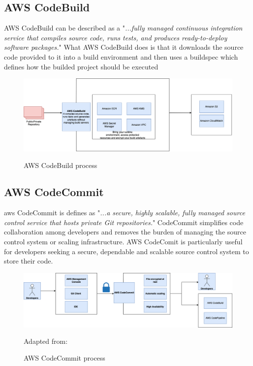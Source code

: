 \subsection{AWS CodeBuild }
AWS CodeBuild can be described as a "\textit{...fully managed continuous integration service that compiles source code, runs tests, and produces ready-to-deploy software packages.}"
\cite{AWSCodeBuild}
What AWS CodeBuild does is that it downloads the source code provided to it into a build environment and then uses a \Gls{buildspec} which defines how the builded project should be executed\cite{AWSCodeBuild1}
\begin{figure}[H]
    \centering
    \includegraphics[scale=0.4]{Images/CodeBuild.png}
    \caption{AWS CodeBuild process}\cite{AWSCodeBuild}
    \label{fig:AWS CodeBuild Process}
\end{figure}

\subsection{AWS CodeCommit}

\acrshort{aws} CodeCommit is defines as "\textit{...a secure, highly scalable, fully managed source control service that hosts private Git repositories.}"
\cite{AWSCodeCommit1}
CodeCommit simplifies code collaboration among developers and removes the burden of managing the source control system or scaling infrastructure. AWS CodeComit is particularly useful for developers seeking a secure, dependable and scalable source control system to store their code. \cite{AWSCodeCommit}
\begin{figure}[H]
    \centering
    \includegraphics[scale=0.4]{Images/CodeCommit.png}
    \caption{AWS CodeCommit process} Adapted from: \cite{AWSCodeCommit1}
    \label{fig:AWS CodeCommit Process}
\end{figure}

